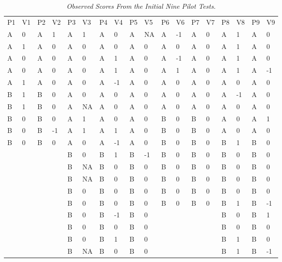 \documentclass{article}
\begin{document}
\begin{table}

  \caption{\emph{Observed }\emph{Scores }\emph{From} \emph{the} \emph{Initial Nine} \emph{Pilot Tests.} }
\label{Table 2}

\begin{tabular}{l  l  l  l  l  l  l  l  l  l  l  l  l  l  l  l  l  l}

  P1 & V1 & P2 & V2 & P3 & V3 & P4 & V4 & P5 & V5 & P6 & V6 & P7 & V7 & P8 & V8 & P9 & V9\\
A & 0 & A & 1 & A & 1 & A & 0 & A & NA & A & -1 & A & 0 & A & 1 & A & 0\\
A & 1 & A & 0 & A & 0 & A & 0 & A & 0 & A & 0 & A & 0 & A & 1 & A & 0\\
A & 0 & A & 0 & A & 0 & A & 1 & A & 0 & A & -1 & A & 0 & A & 1 & A & 0\\
A & 0 & A & 0 & A & 0 & A & 1 & A & 0 & A & 1 & A & 0 & A & 1 & A & -1\\
A & 1 & A & 0 & A & 0 & A & -1 & A & 0 & A & 0 & A & 0 & A & 0 & A & 0\\
B & 1 & B & 0 & A & 0 & A & 0 & A & 0 & A & 0 & A & 0 & A & -1 & A & 0\\
B & 1 & B & 0 & A & NA & A & 0 & A & 0 & A & 0 & A & 0 & A & 0 & A & 0\\
B & 0 & B & 0 & A & 1 & A & 0 & A & 0 & B & 0 & B & 0 & A & 0 & A & 1\\
B & 0 & B & -1 & A & 1 & A & 1 & A & 0 & B & 0 & B & 0 & A & 0 & A & 0\\
B & 0 & B & 0 & A & 0 & A & -1 & A & 0 & B & 0 & B & 0 & B & 1 & B & 0\\
 &  &  &  & B & 0 & B & 1 & B & -1 & B & 0 & B & 0 & B & 0 & B & 0\\
 &  &  &  & B & NA & B & 0 & B & 0 & B & 0 & B & 0 & B & 0 & B & 0\\
 &  &  &  & B & NA & B & 0 & B & 0 & B & 0 & B & 0 & B & 0 & B & 0\\
 &  &  &  & B & 0 & B & 0 & B & 0 & B & 0 & B & 0 & B & 0 & B & 0\\
 &  &  &  & B & 0 & B & 0 & B & 0 & B & 0 & B & 0 & B & 1 & B & -1\\
 &  &  &  & B & 0 & B & -1 & B & 0 &  &  &  &  & B & 0 & B & 1\\
 &  &  &  & B & 0 & B & 0 & B & 0 &  &  &  &  & B & 0 & B & 0\\
 &  &  &  & B & 0 & B & 1 & B & 0 &  &  &  &  & B & 1 & B & 0\\
 &  &  &  & B & NA & B & 0 & B & 0 &  &  &  &  & B & 1 & B & -1\\

\end{tabular}
\end{table}
\end{document}
